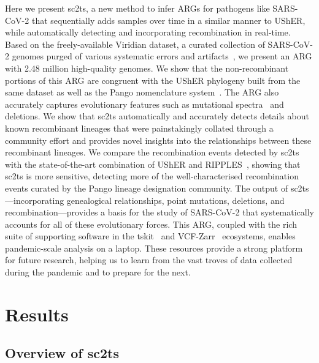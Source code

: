 \documentclass[12pt]{article}
\begin{document}
Here we present sc2ts, a new method to infer ARGs for pathogens like SARS-CoV-2
that sequentially adds samples over time in a similar manner
to UShER, while automatically detecting and incorporating recombination
in real-time. Based on the freely-available Viridian dataset, a curated
collection of SARS-CoV-2 genomes purged of various systematic errors
and artifacts~\cite{Hunt2024},
we present an ARG with 2.48 million high-quality genomes.
We show that the non-recombinant portions of this ARG are
congruent with the UShER phylogeny built
from the same dataset as well as the Pango nomenclature system~\cite{Rambaut2020}.
The ARG also accurately captures evolutionary features such as mutational
spectra~\cite{Bloom2023} and deletions\cite{Li2023indels}.
We show that sc2ts automatically and accurately detects details about
known recombinant lineages that were painstakingly collated through
a community effort and provides novel insights into the relationships between these
recombinant lineages. We compare the recombination events detected by
sc2ts with the state-of-the-art combination of UShER and
RIPPLES~\cite{Turakhia2022}, showing that sc2ts is more sensitive,
detecting more of the well-characterised recombination events
curated by the Pango lineage designation community.
The output of sc2ts---incorporating
genealogical relationships, point mutations, deletions, and
recombination---provides a basis for the study of SARS-CoV-2
that systematically accounts for all of these evolutionary forces.
This ARG, coupled with the rich suite of supporting software
in the tskit~\cite{Ralph2020} and VCF-Zarr~\cite{Czech2025} ecosystems,
enables pandemic-scale analysis on a laptop.
These resources provide a strong platform for future research,
helping us to learn from the vast troves of data collected during the
pandemic and to prepare for the next.


\section*{Results}
\subsection*{Overview of sc2ts}
\end{document}
